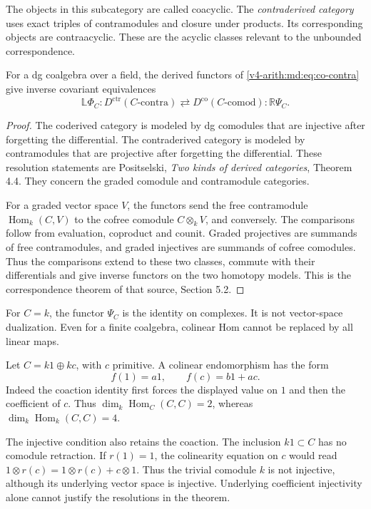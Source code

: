 The objects in this subcategory are called coacyclic.
The \emph{contraderived category} uses exact triples of
contramodules and closure under products. Its corresponding
objects are contraacyclic. These are the acyclic classes relevant
to the unbounded correspondence.

\begin{theorem}
\label{v4-arith:md:thm:co-contra}
For a dg coalgebra over a field, the derived functors of
\eqref{v4-arith:md:eq:co-contra} give inverse covariant equivalences
\[
 \mathbb L\Phi_C:D^{\mathrm{ctr}}(C\text{-contra})
 \rightleftarrows D^{\mathrm{co}}(C\text{-comod}):\mathbb R\Psi_C.
\]
\end{theorem}

\begin{proof}
The coderived category is modeled by dg comodules that are
injective after forgetting the differential. The contraderived
category is modeled by contramodules that are projective after
forgetting the differential. These resolution statements are
Positselski, \emph{Two kinds of derived categories}, Theorem 4.4.
They concern the graded comodule and contramodule categories.

For a graded vector space $V$, the functors send the free
contramodule $\operatorname{Hom}_k(C,V)$ to the cofree comodule
$C\otimes_kV$, and conversely. The comparisons follow from
evaluation, coproduct and counit. Graded projectives are
summands of free contramodules, and graded injectives are
summands of cofree comodules. Thus the comparisons extend to
these two classes, commute with their differentials and give
inverse functors on the two homotopy models. This is the
correspondence theorem of that source, Section 5.2.
\end{proof}

For $C=k$, the functor $\Psi_C$ is the identity on complexes.
It is not vector-space dualization. Even for a finite coalgebra,
colinear Hom cannot be replaced by all linear maps.

Let
$C=k1\oplus kc$, with $c$ primitive. A colinear endomorphism
has the form
\[
 f(1)=a1,\qquad f(c)=b1+ac.
\]
Indeed the coaction identity first forces the displayed value
on $1$ and then the coefficient of $c$. Thus
$\dim_k\operatorname{Hom}_C(C,C)=2$, whereas
$\dim_k\operatorname{Hom}_k(C,C)=4$.

The injective condition also retains the coaction. The inclusion
$k1\subset C$ has no comodule retraction. If $r(1)=1$, the
colinearity equation on $c$ would read
$1\otimes r(c)=1\otimes r(c)+c\otimes1$. Thus the trivial
comodule $k$ is not injective, although its underlying vector
space is injective. Underlying coefficient injectivity alone
cannot justify the resolutions in the theorem.

